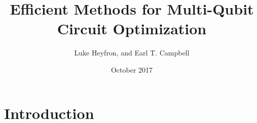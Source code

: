 \documentclass[notitlepage]{article}
\title{Efficient Methods for Multi-Qubit Circuit Optimization}
\author{Luke Heyfron, and Earl T. Campbell}
\date{October 2017}
\theoremstyle{definition}
\theoremstyle{problem}
\theoremstyle{lemma}
\begin{document}
	\maketitle
	\begin{abstract}

	\end{abstract}
	
	\section{Introduction}

		
\end{document}
